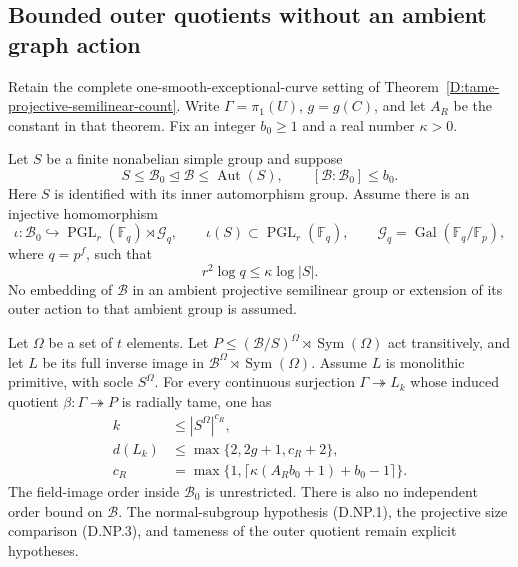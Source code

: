 \subsection{Bounded outer quotients without an ambient graph action}

\begin{corollary}
\label{D:normal-subgroup-projective-crowns}
Retain the complete one-smooth-exceptional-curve setting of
Theorem~\ref{D:tame-projective-semilinear-count}. Write
$\Gamma=\pi_1(U)$, $g=g(C)$, and let $A_R$ be the constant
in that theorem. Fix an integer $b_0\geq1$ and a real
number $\kappa>0$.

Let $S$ be a finite nonabelian simple group and suppose
\[
 S\leq\mathcal B_0\mathrel{\trianglelefteq}\mathcal B
       \leq\operatorname{Aut}(S),\qquad
              [\mathcal B:\mathcal B_0]\leq b_0.
                                                        \tag{D.NP.1}
\]
Here $S$ is identified with its inner automorphism group.
Assume there is an injective homomorphism
\[
 \iota:\mathcal B_0\hookrightarrow
       \operatorname{PGL}_r(\mathbb F_q)
                  \rtimes\mathcal G_q,
 \qquad \iota(S)\subset\operatorname{PGL}_r(\mathbb F_q),
 \qquad \mathcal G_q=\operatorname{Gal}(\mathbb F_q/\mathbb F_p),
                                                        \tag{D.NP.2}
\]
where $q=p^f$, such that
\[
                       r^2\log q\leq\kappa\log|S|.
                                                        \tag{D.NP.3}
\]
No embedding of $\mathcal B$ in an ambient projective
semilinear group or extension of its outer action to that
ambient group is assumed.

Let $\Omega$ be a set of $t$ elements. Let
$P\leq(\mathcal B/S)^\Omega\rtimes\operatorname{Sym}(\Omega)$
act transitively, and let $L$ be its full inverse image in
$\mathcal B^\Omega\rtimes\operatorname{Sym}(\Omega)$.
Assume $L$ is monolithic primitive, with socle $S^\Omega$.
For every continuous surjection $\Gamma\twoheadrightarrow L_k$
whose induced quotient $\beta:\Gamma\twoheadrightarrow P$
is radially tame, one has
\[
 \begin{split}
 k&\leq |S^\Omega|^{c_R},\\
 d(L_k)&\leq\max\{2,2g+1,c_R+2\},\\
 c_R&=\max\{1,\lceil\kappa(A_Rb_0+1)+b_0-1\rceil\}.
 \end{split}                                           \tag{D.NP.4}
\]
The field-image order inside $\mathcal B_0$ is unrestricted.
There is also no independent order bound on $\mathcal B$.
The normal-subgroup hypothesis (D.NP.1), the projective
size comparison (D.NP.3), and tameness of the outer quotient
remain explicit hypotheses.
\end{corollary}

